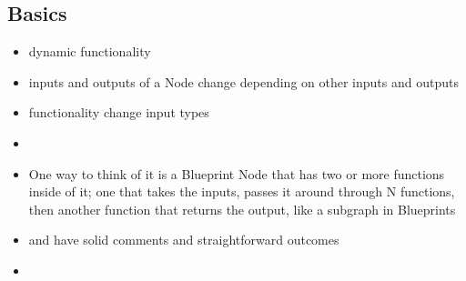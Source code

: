         \subsection{Basics}
            \begin{itemize}
                \item dynamic functionality
                \item inputs and outputs of a Node change depending on other inputs and outputs
                \item functionality change input types
                \item 
                \item One way to think of it is a Blueprint Node that has two or more functions
                      inside of it; one that takes the inputs, passes it around through N functions,
                      then another function that returns the output, like a subgraph in Blueprints
                \item {} and  have solid comments and straightforward outcomes
                \item 
            \end{itemize}